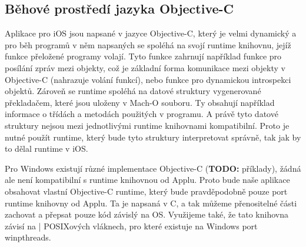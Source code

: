 \documentclass[12pt]{article}
\newcommand{\Rplus}{\protect\hspace{-.1em}\protect\raisebox{.35ex}{\smaller{\smaller\textbf{+}}}}
\newcommand{\Cpp}{\mbox{C\Rplus\Rplus}\xspace}
\begin{document}
\subsection*{Běhové prostředí jazyka Objective-C}

Aplikace pro iOS jsou napsané v jazyce Objective-C, který je velmi dynamický a pro běh programů v něm napsaných se spoléhá na svojí runtime knihovnu, jejíž funkce přeložené programy volají.
Tyto funkce zahrnují například funkce pro posílání zpráv mezi objekty, což je základní forma komunikace mezi objekty v Objective-C (nahrazuje volání funkcí), nebo funkce pro dynamickou introspekci objektů.
Zároveň se runtime spoléhá na datové struktury vygenerované překladačem, které jsou uloženy v Mach-O souboru.
Ty obsahují například informace o třídách a metodách použitých v programu.
A právě tyto datové struktury nejsou mezi jednotlivými runtime knihovnami kompatibilní.
Proto je nutné použít runtime, který bude tyto struktury interpretovat správně, tak jak by to dělal runtime v iOS.

Pro Windows existují různé implementace Objective-C (\textbf{TODO:} příklady), žádná ale není kompatibilní s runtime knihovnou od Applu.
Proto bude naše aplikace obsahovat vlastní Objective-C runtime, který bude pravděpodobně pouze port runtime knihovny od Applu.
Ta je napsaná v \Cpp, a tak můžeme přenositelné části zachovat a přepsat pouze kód závislý na OS.
Využijeme také, že tato knihovna závisí na | POSIXových vláknech, pro které existuje na Windows port winpthreads.



\end{document}
